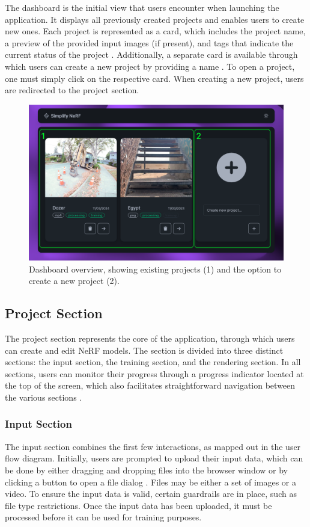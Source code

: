 The dashboard is the initial view that users encounter when launching the application.
It displays all previously created projects and enables users to create new ones.
Each project is represented as a card, which includes the project name, a preview of the provided input images (if present), and tags that indicate the current status of the project .
Additionally, a separate card is available through which users can create a new project by providing a name .
To open a project, one must simply click on the respective card.
When creating a new project, users are redirected to the project section.

\begin{figure}[htb]
  \centering
  \includegraphics[width=.65\textwidth]{figures/view-overview.png}
  \caption{Dashboard overview, showing existing projects (1) and the option to create a new project (2).}
  \label{fig:design:dashboard}
\end{figure}

\subsection*{Project Section}

The project section represents the core of the application, through which users can create and edit NeRF models.
The section is divided into three distinct sections: the input section, the training section, and the rendering section.
In all sections, users can monitor their progress through a progress indicator located at the top of the screen, which also facilitates straightforward navigation between the various sections .

\subsubsection*{Input Section}

The input section combines the first few interactions, as mapped out in the user flow diagram.
Initially, users are prompted to upload their input data, which can be done by either dragging and dropping files into the browser window or by clicking a button to open a file dialog .
Files may be either a set of images or a video. To ensure the input data is valid, certain guardrails are in place, such as file type restrictions.
Once the input data has been uploaded, it must be processed before it can be used for training purposes.

